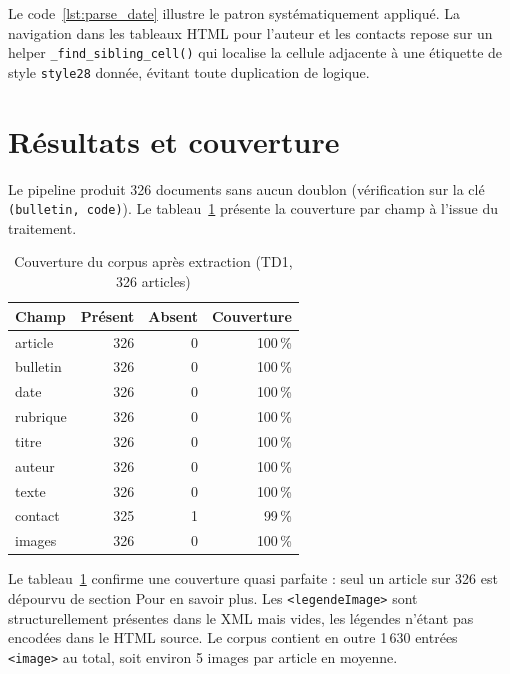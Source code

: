 Le code~\ref{lst:parse_date} illustre le patron systématiquement appliqué. La navigation
dans les tableaux HTML pour l'auteur et les contacts repose sur un helper
\texttt{\_find\_sibling\_cell()} qui localise la cellule adjacente à une étiquette
de style \texttt{style28} donnée, évitant toute duplication de logique.

\section{Résultats et couverture}

Le pipeline produit 326 documents sans aucun doublon (vérification sur la clé
\texttt{(bulletin, code)}). Le tableau~\ref{tab:td1_coverage} présente la couverture
par champ à l'issue du traitement.

\begin{table}[ht]
\centering
\caption{Couverture du corpus après extraction (TD1, 326 articles)}
\label{tab:td1_coverage}
\begin{tabular}{lrrr}
\toprule
\textbf{Champ} & \textbf{Présent} & \textbf{Absent} & \textbf{Couverture} \\
\midrule
article  & 326 & 0 & 100\,\% \\
bulletin & 326 & 0 & 100\,\% \\
date     & 326 & 0 & 100\,\% \\
rubrique & 326 & 0 & 100\,\% \\
titre    & 326 & 0 & 100\,\% \\
auteur   & 326 & 0 & 100\,\% \\
texte    & 326 & 0 & 100\,\% \\
contact  & 325 & 1 &  99\,\% \\
images   & 326 & 0 & 100\,\% \\
\bottomrule
\end{tabular}
\end{table}

Le tableau~\ref{tab:td1_coverage} confirme une couverture quasi parfaite : seul un
article sur 326 est dépourvu de section \og{}Pour en savoir plus\fg{}. Les
\texttt{<legendeImage>} sont structurellement présentes dans le XML mais vides, les
légendes n'étant pas encodées dans le HTML source. Le corpus contient en outre
1\,630 entrées \texttt{<image>} au total, soit environ 5 images par article en moyenne.

